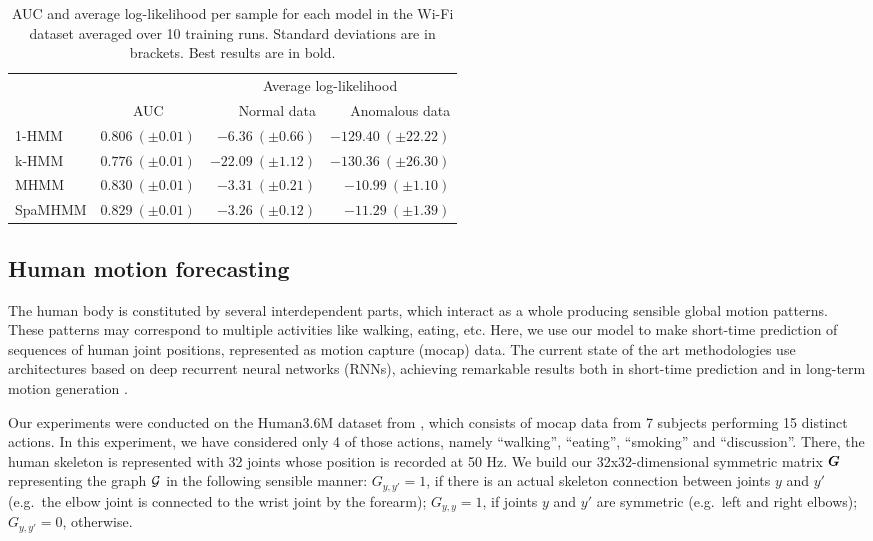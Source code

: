 \begin{table}
	\centering
	\begin{tabular}{l|r|r r}
		\multicolumn{1}{c}{} & \multicolumn{1}{c}{} & \multicolumn{2}{c}{Average log-likelihood} \\
		& \multicolumn{1}{c|}{AUC} & Normal data & Anomalous data \\
		\hline
		1-HMM & $0.806~(\pm 0.01)$ & $-6.36~(\pm 0.66)$ & $-129.40~(\pm 22.22)$ \\
		k-HMM & $0.776~(\pm 0.01)$ & $-22.09~(\pm 1.12)$ & $\mathbf{-130.36}~(\pm 26.30)$ \\
		MHMM & $\mathbf{0.830}~(\pm 0.01)$ & $-3.31~(\pm 0.21)$ & $-10.99~(\pm 1.10)$ \\
		SpaMHMM & $0.829~(\pm 0.01)$ & $\mathbf{-3.26}~(\pm 0.12)$ & $-11.29~(\pm 1.39)$ \\
	\end{tabular}
	\caption{AUC and average log-likelihood per sample for each model in the Wi-Fi dataset averaged over 10 training runs. Standard deviations are in brackets. Best results are in bold.}
	\label{tbl:spamhmm_wifi_results}
\end{table}

\subsection{Human motion forecasting}
\label{sec:h36m}
The human body is constituted by several interdependent parts, which interact as a whole producing sensible global motion patterns. These patterns may correspond to multiple activities like walking, eating, etc. Here, we use our model to make short-time prediction of sequences of human joint positions, represented as motion capture (mocap) data. The current state of the art methodologies use architectures based on deep recurrent neural networks (RNNs), achieving remarkable results both in short-time prediction \citet{Fragkiadaki2015, Martinez2017} and in long-term motion generation \citet{Jain2016, Pavllo2018}.

Our experiments were conducted on the Human3.6M dataset from \citet{Ionescu2011, Ionescu2014}, which consists of mocap data from 7 subjects performing 15 distinct actions. In this experiment, we have considered only 4 of those actions, namely ``walking'', ``eating'', ``smoking'' and ``discussion''. There, the human skeleton is represented with 32 joints whose position is recorded at 50 Hz. We build our 32x32-dimensional symmetric matrix ${\bm{G}}$ representing the graph ${\mathcal{G}}$ in the following sensible manner: $G_{y,y'}=1$, if there is an actual skeleton connection between joints $y$ and $y'$ (e.g.\  the elbow joint is connected to the wrist joint by the forearm); $G_{y,y}=1$, if joints $y$ and $y'$ are symmetric (e.g.\  left and right elbows); $G_{y,y'}=0$, otherwise.

